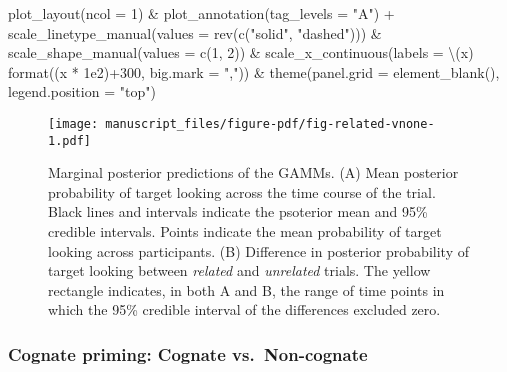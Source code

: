 \documentclass[
  letterpaper,
  DIV=11,
  numbers=noendperiod]{scrartcl}
\newenvironment{Shaded}{\begin{snugshade}}{\end{snugshade}}
\newcommand{\AttributeTok}[1]{\textcolor[rgb]{0.40,0.45,0.13}{#1}}
\newcommand{\DecValTok}[1]{\textcolor[rgb]{0.68,0.00,0.00}{#1}}
\newcommand{\FloatTok}[1]{\textcolor[rgb]{0.68,0.00,0.00}{#1}}
\newcommand{\FunctionTok}[1]{\textcolor[rgb]{0.28,0.35,0.67}{#1}}
\newcommand{\NormalTok}[1]{\textcolor[rgb]{0.00,0.23,0.31}{#1}}
\newcommand{\SpecialCharTok}[1]{\textcolor[rgb]{0.37,0.37,0.37}{#1}}
\newcommand{\StringTok}[1]{\textcolor[rgb]{0.13,0.47,0.30}{#1}}
\begin{document}
\begin{Shaded}
\begin{Highlighting}[]
    \FunctionTok{plot\_layout}\NormalTok{(}\AttributeTok{ncol =} \DecValTok{1}\NormalTok{) }\SpecialCharTok{\&}
    \FunctionTok{plot\_annotation}\NormalTok{(}\AttributeTok{tag\_levels =} \StringTok{"A"}\NormalTok{) }\SpecialCharTok{+}
    \FunctionTok{scale\_linetype\_manual}\NormalTok{(}\AttributeTok{values =} \FunctionTok{rev}\NormalTok{(}\FunctionTok{c}\NormalTok{(}\StringTok{"solid"}\NormalTok{, }\StringTok{"dashed"}\NormalTok{))) }\SpecialCharTok{\&}
    \FunctionTok{scale\_shape\_manual}\NormalTok{(}\AttributeTok{values =} \FunctionTok{c}\NormalTok{(}\DecValTok{1}\NormalTok{, }\DecValTok{2}\NormalTok{)) }\SpecialCharTok{\&}
    \FunctionTok{scale\_x\_continuous}\NormalTok{(}\AttributeTok{labels =}\NormalTok{ \textbackslash{}(x) }\FunctionTok{format}\NormalTok{((x }\SpecialCharTok{*} \FloatTok{1e2}\NormalTok{)}\SpecialCharTok{+}\DecValTok{300}\NormalTok{, }
                                            \AttributeTok{big.mark =} \StringTok{","}\NormalTok{)) }\SpecialCharTok{\&}
    \FunctionTok{theme}\NormalTok{(}\AttributeTok{panel.grid =} \FunctionTok{element\_blank}\NormalTok{(),}
          \AttributeTok{legend.position =} \StringTok{"top"}\NormalTok{) }
\end{Highlighting}
\end{Shaded}

\begin{figure}[H]

{\centering \texttt{[image: manuscript\_files/figure-pdf/fig-related-vnone-1.pdf]}

}

\caption{\label{fig-related-vnone}Marginal posterior predictions of the
GAMMs. (A) Mean posterior probability of target looking across the time
course of the trial. Black lines and intervals indicate the psoterior
mean and 95\% credible intervals. Points indicate the mean probability
of target looking across participants. (B) Difference in posterior
probability of target looking between \emph{related} and
\emph{unrelated} trials. The yellow rectangle indicates, in both A and
B, the range of time points in which the 95\% credible interval of the
differences excluded zero.}

\end{figure}

\hypertarget{cognate-priming-cognate-vs.-non-cognate-2}{%
\subsubsection{Cognate priming: Cognate
vs.~Non-cognate}\label{cognate-priming-cognate-vs.-non-cognate-2}}
\end{document}
